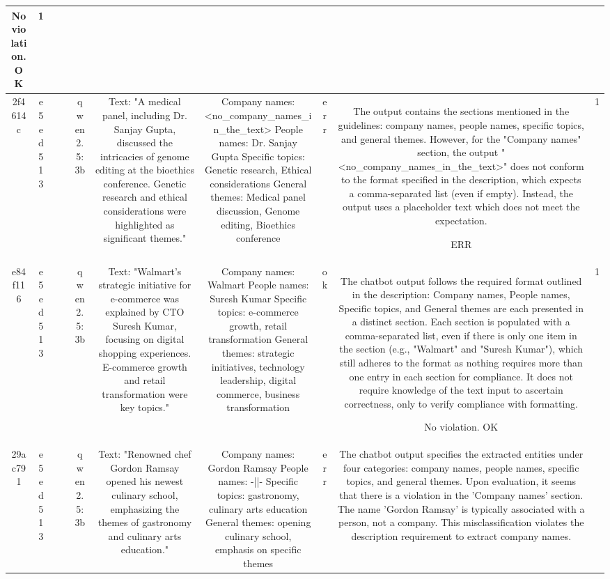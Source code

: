 \begin{table}[h!]
\begin{tabular}{|c|c|c|c|c|c|c|c|c|c|}
No violation.
OK & 1\\
\hline
2f4614c & e5ed513 &  &  & qwen2.5:3b & Text: "A medical panel, including Dr. Sanjay Gupta, discussed the intricacies of genome editing at the bioethics conference. Genetic research and ethical considerations were highlighted as significant themes." & Company names: <no_company_names_in_the_text>
People names: Dr. Sanjay Gupta
Specific topics: Genetic research, Ethical considerations
General themes: Medical panel discussion, Genome editing, Bioethics conference & err & The output contains the sections mentioned in the guidelines: company names, people names, specific topics, and general themes. However, for the "Company names" section, the output "<no_company_names_in_the_text>" does not conform to the format specified in the description, which expects a comma-separated list (even if empty). Instead, the output uses a placeholder text which does not meet the expectation.

ERR & 1\\
\hline
e84f116 & e5ed513 &  &  & qwen2.5:3b & Text: "Walmart's strategic initiative for e-commerce was explained by CTO Suresh Kumar, focusing on digital shopping experiences. E-commerce growth and retail transformation were key topics." & Company names: Walmart
People names: Suresh Kumar
Specific topics: e-commerce growth, retail transformation
General themes: strategic initiatives, technology leadership, digital commerce, business transformation & ok & The chatbot output follows the required format outlined in the description: Company names, People names, Specific topics, and General themes are each presented in a distinct section. Each section is populated with a comma-separated list, even if there is only one item in the section (e.g., "Walmart" and "Suresh Kumar"), which still adheres to the format as nothing requires more than one entry in each section for compliance. It does not require knowledge of the text input to ascertain correctness, only to verify compliance with formatting.

No violation.
OK & 1\\
\hline
29ac791 & e5ed513 &  &  & qwen2.5:3b & Text: "Renowned chef Gordon Ramsay opened his newest culinary school, emphasizing the themes of gastronomy and culinary arts education." & Company names: Gordon Ramsay
People names: -||-
Specific topics: gastronomy, culinary arts education
General themes: opening culinary school, emphasis on specific themes & err & The chatbot output specifies the extracted entities under four categories: company names, people names, specific topics, and general themes. Upon evaluation, it seems that there is a violation in the 'Company names' section. The name 'Gordon Ramsay' is typically associated with a person, not a company. This misclassification violates the description requirement to extract company names.


\end{tabular}
\end{table}

